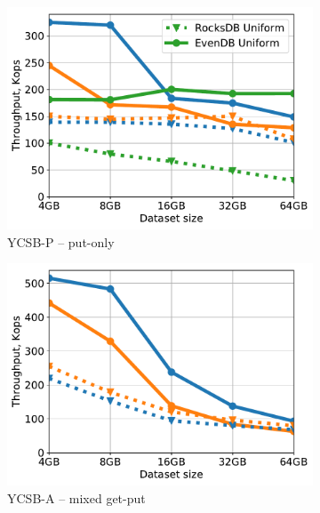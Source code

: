 \begin{figure}[tb]
\centering
\begin{subfigure}{0.33\linewidth}
\includegraphics[width=\textwidth]{figs/Workload_P_line.pdf}
\caption{YCSB-P -- put-only}
\label{fig:throughput:p}
\end{subfigure}
\begin{subfigure}{0.33\linewidth}
\includegraphics[width=\textwidth]{figs/Workload_A_line.pdf}
\caption{YCSB-A -- mixed get-put}
\label{fig:throughput:a}
\end{subfigure}
\begin{subfigure}{0.33\linewidth}

\end{subfigure}
\end{figure}
